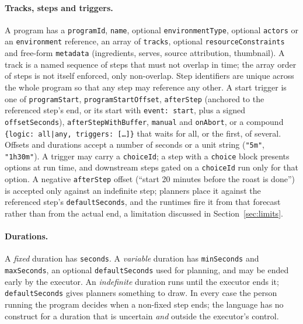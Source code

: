 \documentclass[10pt]{article}
\newcommand{\code}[1]{\texttt{#1}}
\begin{document}
\paragraph{Tracks, steps and triggers.} A program has a \code{programId}, \code{name}, optional \code{environmentType}, optional \code{actors} or an \code{environment} reference, an array of \code{tracks}, optional \code{resourceConstraints} and free-form \code{metadata} (ingredients, serves, source attribution, thumbnail). A track is a named sequence of steps that must not overlap in time; the array order of steps is not itself enforced, only non-overlap. Step identifiers are unique across the whole program so that any step may reference any other. A start trigger is one of \code{programStart}, \code{programStartOffset}, \code{afterStep} (anchored to the referenced step's end, or its start with \code{event:\,start}, plus a signed \code{offsetSeconds}), \code{afterStepWithBuffer}, \code{manual} and \code{onAbort}, or a compound \code{\{logic: all|any, triggers: [\ldots]\}} that waits for all, or the first, of several. Offsets and durations accept a number of seconds or a unit string (\code{"5m"}, \code{"1h30m"}). A trigger may carry a \code{choiceId}; a step with a \code{choice} block presents options at run time, and downstream steps gated on a \code{choiceId} run only for that option. A negative \code{afterStep} offset (``start 20 minutes before the roast is done'') is accepted only against an indefinite step; planners place it against the referenced step's \code{defaultSeconds}, and the runtimes fire it from that forecast rather than from the actual end, a limitation discussed in Section~\ref{sec:limits}.

\paragraph{Durations.} A \emph{fixed} duration has \code{seconds}. A \emph{variable} duration has \code{minSeconds} and \code{maxSeconds}, an optional \code{defaultSeconds} used for planning, and may be ended early by the executor. An \emph{indefinite} duration runs until the executor ends it; \code{defaultSeconds} gives planners something to draw. In every case the person running the program decides when a non-fixed step ends; the language has no construct for a duration that is uncertain \emph{and} outside the executor's control.
\end{document}
